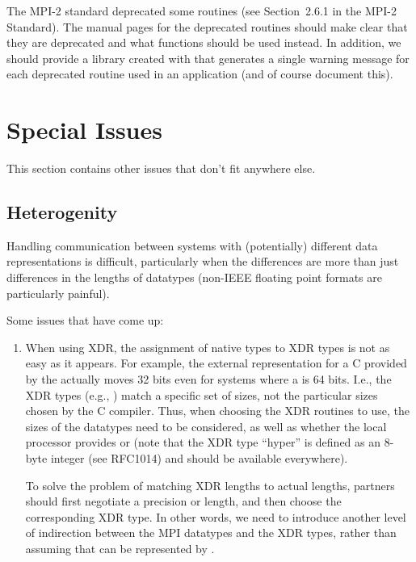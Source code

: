 \documentclass{article}
\begin{document}
The MPI-2 standard deprecated some routines (see Section~2.6.1 in the MPI-2
Standard).  The manual pages for the deprecated routines should make clear
that they are deprecated and what functions should be used instead.  In
addition, we should provide a library created with  that
generates a single warning message for each deprecated routine used in an
application (and of course document this).


%

\section{Special Issues}
This section contains other issues that don't fit anywhere else.

\label{sec:special-issues}

\subsection{Heterogenity}
\label{sec:hetero-issues}

Handling communication between systems with (potentially) different data
representations is difficult, particularly when the differences are more than
just differences in the lengths of datatypes (non-IEEE floating point formats
are particularly painful).

Some issues that have come up:
\begin{enumerate}
\item When using XDR, the assignment of native types to XDR types
  is not as easy as it appears.  For example, the external representation for
  a C  provided by the  actually moves 32 bits
  even for systems where a  is 64 bits.  I.e., the XDR types (e.g.,
  ) match a specific set of sizes, not the particular sizes
  chosen by the C compiler.  Thus, when choosing the XDR routines to use, the
  sizes of the datatypes need to be considered, as well as whether the local
  processor provides  or  (note that the
  XDR type ``hyper'' is defined as an 8-byte integer (see RFC1014) and should
  be available everywhere).

  To solve the problem of matching XDR lengths to actual lengths,
  partners should first negotiate a precision or length, and then
  choose the corresponding XDR type.  In other words, we need to
  introduce another level of indirection between the MPI datatypes and
  the XDR types, rather than assuming that  can be
  represented by .  

\end{enumerate}
\end{document}
